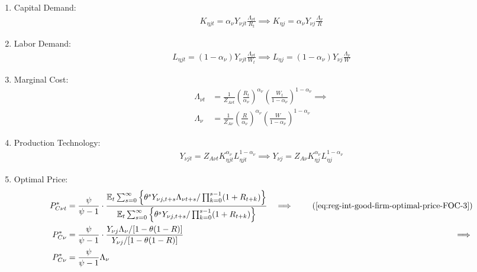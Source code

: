 \documentclass[
	thesis.tex
	]{subfiles}
\begin{document}
\begin{enumerate}
	\item Capital Demand:
	\begin{align}
		K_{\eta jt} = {\alpha_\nu} Y_{\nu jt} \frac{\Lambda_{\nu t}}{R_t} \implies K_{\eta j} = {\alpha_\nu} Y_{\nu j} \frac{\Lambda_{\nu}}{R} \label{eq:reg-ss-int-good-firm-FOC-Kt}
	\end{align}
	
	\item Labor Demand:
	\begin{align}
		L_{\eta jt} = (1-{\alpha_\nu}) Y_{\nu jt} \frac{\Lambda_{\nu t}}{W_t} \implies L_{\eta j} = (1 -{\alpha_\nu}) Y_{\nu j} \frac{\Lambda_{\nu}}{W} \label{eq:reg-ss-int-good-firm-FOC-Lt}
	\end{align}
	
	
	\item Marginal Cost:
	\begin{align}
		\Lambda_{\nu t} &= \frac{1}{Z_{A\nu t}} \left( \frac{R_t}{{\alpha_\nu}} \right)^{{\alpha_\nu}} \left( \frac{W_t}{1-{\alpha_\nu}} \right)^{1-{\alpha_\nu}} \implies \nonumber \\
		\Lambda_{\nu} &= \frac{1}{Z_{A\nu}} \left( \frac{R}{{\alpha_\nu}} \right)^{{\alpha_\nu}} \left( \frac{W}{1-{\alpha_\nu}} \right)^{1-{\alpha_\nu}} \label{eq:reg-ss-int-good-firm-MC-2}
	\end{align}
	
	\item Production Technology:
	\begin{align}
		Y_{\nu jt} = Z_{A\nu t} K_{\eta jt}^{\alpha_\nu} L_{\eta jt}^{1-{\alpha_\nu}} \implies Y_{\nu j} = Z_{A\nu} K_{\eta j}^{\alpha_\nu} L_{\eta j}^{1-{\alpha_\nu}} \label{eq:reg-ss-int-good-firm-production-function}
	\end{align}
	
	\item Optimal Price:
	\begin{alignat}{2}
		P_{C\nu t}^\ast &= \frac{\psi}{\psi-1} \cdot \frac{\E \sum_{s=0}^{\infty} \left\{\theta^s Y_{\nu j,t+s} \Lambda_{\nu t+s} / \prod_{k=0}^{s-1}(1+R_{t+k}) \right\}} {\E \sum_{s=0}^{\infty} \left\{ \theta^s Y_{\nu j,t+s} / \prod_{k=0}^{s-1}(1+R_{t+k}) \right\}} &\implies \tag{\ref{eq:reg-int-good-firm-optimal-price-FOC-3}} \\
		P_{C\nu}^\ast &= \frac{\psi}{\psi-1} \cdot \frac{ Y_{\nu j} \Lambda_{\nu} / [1-\theta(1-R)]} {Y_{\nu j} / [1-\theta(1-R)]} &\implies \nonumber \\
		P_{C\nu}^\ast &= \frac{\psi}{\psi-1} \Lambda_{\nu} \label{eq:reg-ss-int-good-firm-optimal-price-FOC-3}
	\end{alignat}
	

\end{enumerate}
\end{document}
